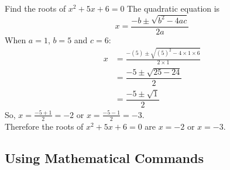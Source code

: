\documentclass[a4paper,11pt,twoside]{article}
\begin{document}
\begin{center}
	\begin{minipage}{0.7\textwidth}
		\begin{question}[5]
			Find the roots of $x^2 +5x +6 = 0$
			\qpart %
			\qsubpart %
			The quadratic equation is \[
			x=\frac{-b\pm\sqrt{b^2-4ac}}{2a}
			\]
			\qsubpart %
			When $a=1$, $b=5$ and $c=6$:
			\begin{align}
				x &= \frac{-(5)\pm\sqrt{(5)^2-4\times1\times6}}{2\times1} \\
				&= \dfrac{-5\pm\sqrt{25-24}}{2} \\
				&= \dfrac{-5\pm\sqrt{1}}{2}
			\end{align}
			\qsubpart %
			So, $x=\frac{-5+1}{2}=-2$ or $x=\frac{-5-1}{2}=-3$.\\[0.5cm]

			Therefore the roots of $x^2 +5x +6 = 0$ are $x=-2$ or $x=-3$.
		\end{question}
	\end{minipage}
\end{center}

\subsection{Using Mathematical Commands}
\end{document}
